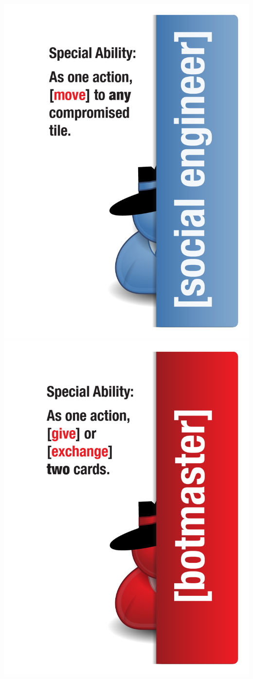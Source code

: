 \documentclass{letter}
\begin{document}
\includegraphics{characters/character_social_engineer}
\includegraphics{characters/character_botmaster}
\end{document}
